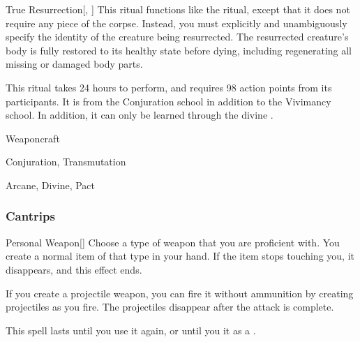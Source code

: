 \lowercase{\hypertarget{spell:True Resurrection}{}}\label{spell:True Resurrection}
\begin{apability}[Rank 8]{\hypertarget{spell:True Resurrection}{True Resurrection}}[, ]
This ritual functions like the  ritual, except that it does not require any piece of the corpse.
Instead, you must explicitly and unambiguously specify the identity of the creature being resurrected.
The resurrected creature's body is fully restored to its healthy state before dying, including regenerating all missing or damaged body parts.

This ritual takes 24 hours to perform, and requires 98 action points from its participants.
It is from the Conjuration school in addition to the Vivimancy school.
In addition, it can only be learned through the divine .
\end{apability}
\vspace{0.25em}


\newpage
\begin{spellsection}{Weaponcraft}

\begin{spellheader}
\end{spellheader}


 Conjuration, Transmutation

 Arcane, Divine, Pact

\subsubsection{Cantrips}


\begin{freeability}{Personal Weapon}[]
Choose a type of weapon that you are proficient with.
You create a normal item of that type in your hand.
If the item stops touching you, it disappears, and this effect ends.

If you create a projectile weapon, you can fire it without ammunition by creating projectiles as you fire.
The projectiles disappear after the attack is complete.

This spell lasts until you use it again, or until you  it as a .
\end{freeability}

\end{spellsection}


